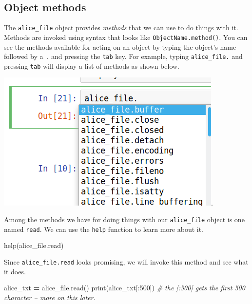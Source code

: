 \documentclass[]{book}
\newenvironment{Shaded}{\begin{snugshade}}{\end{snugshade}}
\newcommand{\BuiltInTok}[1]{#1}
\newcommand{\CommentTok}[1]{\textcolor[rgb]{0.56,0.35,0.01}{\textit{#1}}}
\newcommand{\DecValTok}[1]{\textcolor[rgb]{0.00,0.00,0.81}{#1}}
\newcommand{\NormalTok}[1]{#1}
\newcommand{\OperatorTok}[1]{\textcolor[rgb]{0.81,0.36,0.00}{\textbf{#1}}}
\begin{document}
\hypertarget{object-methods}{%
\subsection{Object methods}\label{object-methods}}

The \texttt{alice\_file} object provides \emph{methods} that we can use to do things with it. Methods are invoked using syntax that looks like \texttt{ObjectName.method()}. You can see the methods available for acting on an object by typing the object's name followed by a \texttt{.} and pressing the \texttt{tab} key. For example, typing \texttt{alice\_file.} and pressing \texttt{tab} will display a list of methods as shown below.

\includegraphics{Python/PythonIntro/images/notebook_file_completion.png}.

Among the methods we have for doing things with our \texttt{alice\_file} object is one named \texttt{read}. We can use the \texttt{help} function to learn more about it.

\begin{Shaded}
\begin{Highlighting}[]
\BuiltInTok{help}\NormalTok{(alice_file.read)}
\end{Highlighting}
\end{Shaded}

Since \texttt{alice\_file.read} looks promising, we will invoke this method and see what it does.

\begin{Shaded}
\begin{Highlighting}[]
\NormalTok{alice_txt }\OperatorTok{=}\NormalTok{ alice_file.read()}
\BuiltInTok{print}\NormalTok{(alice_txt[:}\DecValTok{500}\NormalTok{]) }\CommentTok{# the [:500] gets the first 500 character -- more on this later.}
\end{Highlighting}
\end{Shaded}
\end{document}
